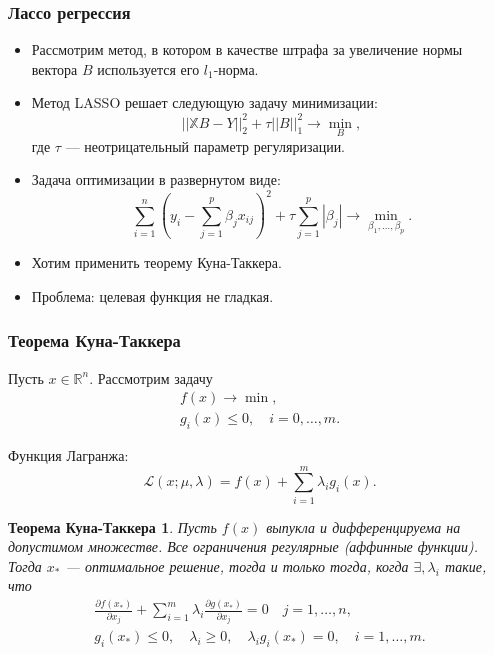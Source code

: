 \documentclass[10pt,unicode, notheorems]{beamer}
\newtheorem{theoremCT}{Теорема Куна-Таккера}
\begin{document}
\begin{frame}
\frametitle{Лассо регрессия}
\begin{itemize}
\item Рассмотрим метод, в котором в качестве штрафа за увеличение нормы вектора $B$ используется его $l_{1}$-норма.
\item Метод LASSO решает следующую задачу минимизации:
\begin{equation*}
||\mathbb{X}B-Y||_{2}^{2}
+
\tau||B||_{1}^{2}
\rightarrow\min_{B},
\end{equation*}
где $\tau$ --- неотрицательный параметр регуляризации.
\item Задача оптимизации в развернутом виде:
\begin{equation*}
\sum_{i=1}^{n}
\left(
y_{i}
-
\sum_{j=1}^{p}\beta_{j}x_{ij}
\right)^{2}
+
\tau\sum_{j=1}^{p}|\beta_{j}|
\rightarrow\min_{\beta_{1},\ldots,\beta_{p}}.
\end{equation*}
\item Хотим применить теорему Куна-Таккера.
\item Проблема: целевая функция не гладкая. 
\end{itemize}
\end{frame}




\begin{frame}
\frametitle{Теорема Куна-Таккера}

Пусть $x\in\mathbb{R}^{n}$. Рассмотрим задачу 
\begin{gather*}
f(x)\to\min,\\
g_{i}(x)\leq 0,
\quad
i=0,\ldots,m.
\end{gather*}

Функция Лагранжа:
\begin{equation*}
\mathcal{L}(x;\mu,\lambda)
=
f(x)+
\sum_{i=1}^{m}\lambda_{i}g_{i}(x).
\end{equation*}

\begin{theoremCT}
Пусть $f(x)$ выпукла и дифференцируема на допустимом множестве. Все ограничения регулярные (аффинные функции).
Тогда $x_{\ast}$ --- оптимальное решение, тогда и только тогда, когда $\exists,\lambda_{i}$ такие, что 
\begin{gather*}
\frac{\partial f(x_{\ast})}{\partial x_{j}}
+
\sum_{i=1}^{m}\lambda_{i}\frac{\partial g(x_{\ast})}{\partial x_{j}}=0
\quad
j=1,\ldots,n,\\
g_{i}(x_{\ast})\leq 0,\quad
\lambda_{i}\geq 0,
\quad
\lambda_{i}g_{i}(x_{\ast})=0,
\quad
i=1,\ldots,m.
\end{gather*}
\end{theoremCT}

\end{frame}
\end{document}

